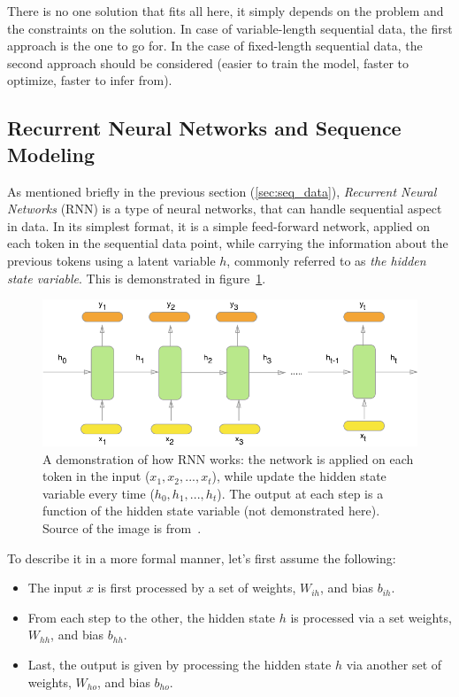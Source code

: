 \par There is no one solution that fits all here, it simply depends on the problem and the constraints on the solution. In case of variable-length sequential data, the first approach is the one to go for. In the case of fixed-length sequential data, the second approach should be considered (easier to train the model, faster to optimize, faster to infer from).

\subsection{Recurrent Neural Networks and Sequence Modeling} \label{sec:RNN}
As mentioned briefly in the previous section (\ref{sec:seq_data}), \textit{Recurrent Neural Networks} (RNN) is a type of neural networks, that can handle sequential aspect in data. In its simplest format, it is a simple feed-forward network, applied on each token in the sequential data point, while carrying the information about the previous tokens using a latent variable $h$, commonly referred to as \textit{the hidden state variable}. This is demonstrated in figure~\ref{fig:basic_rnn_model}.

\begin{figure}
    \centering
    \includegraphics[width=\textwidth]{images/gbem/basic_rnn.png}
    \caption{A demonstration of how RNN works: the network is applied on each token in the input ($x_1, x_2, ..., x_t$), while update the hidden state variable every time ($h_0, h_1, ..., h_t$). The output at each step is a function of the hidden state variable (not demonstrated here). Source of the image is from~\citep{howrnnworks}.}
    \label{fig:basic_rnn_model}
\end{figure}

\par To describe it in a more formal manner, let's first assume the following:
\begin{itemize}
    \item The input $x$ is first processed by a set of weights, $W_{ih}$, and bias $b_{ih}$.
    \item From each step to the other, the hidden state $h$ is processed via a set weights, $W_{hh}$, and bias $b_{hh}$.
    \item Last, the output is given by processing the hidden state $h$ via another set of weights, $W_{ho}$, and bias $b_{ho}$.
\end{itemize}

